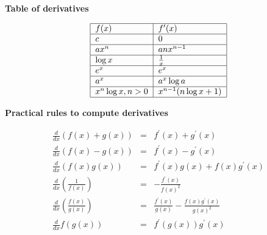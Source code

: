 \documentclass[justified, sixbynine]{tufte-book}
\def\subsubsection#1{{\bf #1}}
\theoremstyle{plain}%
\newtheorem * {corollary}{Corollary}
\theoremstyle{definition}
\theoremstyle{remark}
\newtheorem * {remark}{Remark}
\newtheorem * {note}{Note}
\begin{document}
\begin{fullwidth}
\subsubsection{Table of derivatives}

\begin{equation}
\begin{tabular}{|l|l|}
\hline
$f(x)$ & $f^{\prime }(x)$ \\ \hline
$c$ & $0$ \\ \hline
$ax^n$ & $anx^{n-1}$ \\ \hline
$\log x$ & $\frac 1x$ \\ \hline
$e^x$ & $e^x$ \\ \hline
$a^x$ & $a^x\log a$ \\ \hline
$x^n\log x, n>0$ & $x^{n-1}(n\log x+1)$ \\ \hline
\end{tabular}
\end{equation}

\subsubsection{Practical rules to compute derivatives}

\begin{eqnarray}
\frac d{dx}\left( f(x)+g(x)\right) &=&f^{\prime }(x)+g^{\prime }(x) \\
\frac d{dx}\left( f(x)-g(x)\right) &=&f^{\prime }(x)-g^{\prime }(x) \\
\frac d{dx}\left( f(x)g(x)\right) &=&f^{\prime }(x)g(x)+f(x)g^{\prime }(x) \\
\frac d{dx}\left( \frac 1{f(x)}\right) &=&-\frac{f^{\prime }(x)}{f(x)^2} \\
\frac d{dx}\left( \frac{f(x)}{g(x)}\right) &=&\frac{f^{\prime }(x)}{g(x)}-%
\frac{f(x)g^{\prime }(x)}{g(x)^2} \\
\frac d{dx}f(g(x)) &=&f^{\prime }(g(x))g^{\prime }(x)
\end{eqnarray}

\end{fullwidth}
\backmatter

\printindex
\end{document}
